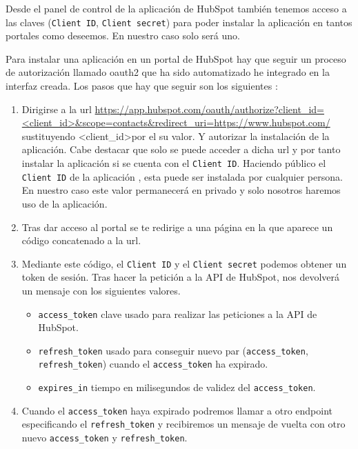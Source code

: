 Desde el panel de control de la aplicación de HubSpot también tenemos acceso a las claves (\verb|Client ID|, \verb|Client secret|) para poder instalar la aplicación en tantos portales como deseemos. En nuestro caso solo será uno.


Para instalar una aplicación en un portal de HubSpot hay que seguir un proceso de autorización llamado \gls{oauth2} que ha sido automatizado he integrado en la interfaz creada. 
Los pasos que hay que seguir son los siguientes \cite{hsapi}:

\begin{enumerate}
	\item Dirigirse a la url \url{https://app.hubspot.com/oauth/authorize?client_id=<client_id>&scope=contacts&redirect_uri=https://www.hubspot.com/}
		\\ 
		sustituyendo \textless client\_id\textgreater por el su valor. Y autorizar la instalación de la aplicación. Cabe destacar que solo se puede acceder a dicha url  y por tanto instalar la aplicación si se cuenta con el \verb|Client ID|.
		Haciendo público el \verb|Client ID| de la aplicación , esta puede ser instalada por cualquier persona. En nuestro caso este valor permanecerá en privado y solo nosotros haremos uso de la aplicación.
		
	\item Tras dar acceso al portal se te redirige a una página en la que aparece un código concatenado a la url.
	\item Mediante este código, el \verb|Client ID| y el \verb|Client secret| podemos obtener un token de sesión.
	Tras hacer la petición a la API de HubSpot, nos devolverá un mensaje con los siguientes valores.
		\begin{itemize}
			\item \verb|access_token| clave usado para realizar las peticiones a la API de HubSpot.
			\item \verb|refresh_token| usado para conseguir nuevo par (\verb|access_token|, \verb|refresh_token|) cuando el \verb|access_token| ha expirado.
			\item \verb|expires_in| tiempo en milisegundos de validez del \verb|access_token|.
		\end{itemize}
	\item Cuando el \verb|access_token| haya expirado podremos llamar a otro endpoint especificando el \verb|refresh_token| y recibiremos un mensaje de vuelta con otro nuevo \verb|access_token| y \verb|refresh_token|.
\end{enumerate}



